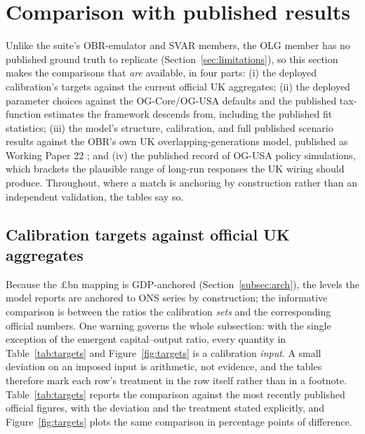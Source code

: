 \section{Comparison with published results}
\label{sec:comparison}

Unlike the suite's OBR-emulator and SVAR members, the OLG member has no published ground truth to replicate (Section~\ref{sec:limitations}), so this section makes the comparisons that \emph{are} available, in four parts: (i) the deployed calibration's targets against the current official UK aggregates; (ii) the deployed parameter choices against the OG-Core/OG-USA defaults and the published \citet{DeBackerEvansPhillips2019} tax-function estimates the framework descends from, including the published fit statistics; (iii) the model's structure, calibration, and full published scenario results against the OBR's own UK overlapping-generations model, published as Working Paper 22 \citep{OBR2025OLG}; and (iv) the published record of OG-USA policy simulations, which brackets the plausible range of long-run responses the UK wiring should produce. Throughout, where a match is anchoring by construction rather than an independent validation, the tables say so.

\subsection{Calibration targets against official UK aggregates}
\label{subsec:targets}

Because the \pounds bn mapping is GDP-anchored (Section~\ref{subsec:arch}), the levels the model reports are anchored to ONS series by construction; the informative comparison is between the ratios the calibration \emph{sets} and the corresponding official numbers. One warning governs the whole subsection: with the single exception of the emergent capital--output ratio, every quantity in Table~\ref{tab:targets} and Figure~\ref{fig:targets} is a calibration \emph{input}. A small deviation on an imposed input is arithmetic, not evidence, and the tables therefore mark each row's treatment in the row itself rather than in a footnote. Table~\ref{tab:targets} reports the comparison against the most recently published official figures, with the deviation and the treatment stated explicitly, and Figure~\ref{fig:targets} plots the same comparison in percentage points of difference.

